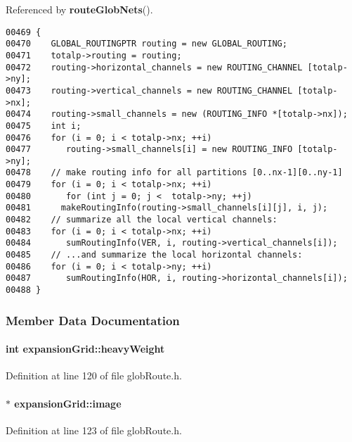 Referenced by {\bf route\-Glob\-Nets}().\small\begin{verbatim}00469 {
00470    GLOBAL_ROUTINGPTR routing = new GLOBAL_ROUTING;
00471    totalp->routing = routing;
00472    routing->horizontal_channels = new ROUTING_CHANNEL [totalp->ny];
00473    routing->vertical_channels = new ROUTING_CHANNEL [totalp->nx];
00474    routing->small_channels = new (ROUTING_INFO *[totalp->nx]);
00475    int i;
00476    for (i = 0; i < totalp->nx; ++i)
00477       routing->small_channels[i] = new ROUTING_INFO [totalp->ny];
00478    // make routing info for all partitions [0..nx-1][0..ny-1]
00479    for (i = 0; i < totalp->nx; ++i)
00480       for (int j = 0; j <  totalp->ny; ++j)
00481      makeRoutingInfo(routing->small_channels[i][j], i, j);
00482    // summarize all the local vertical channels:
00483    for (i = 0; i < totalp->nx; ++i)
00484       sumRoutingInfo(VER, i, routing->vertical_channels[i]);
00485    // ...and summarize the local horizontal channels:
00486    for (i = 0; i < totalp->ny; ++i)
00487       sumRoutingInfo(HOR, i, routing->horizontal_channels[i]);
00488 }
\end{verbatim}\normalsize 


\subsubsection{Member Data Documentation}
\label{expansionGrid_o4}
\paragraph{\setlength{\rightskip}{0pt plus 5cm}int expansion\-Grid::heavy\-Weight\hspace{0.3cm}{\tt  [private]}}\hfill



Definition at line 120 of file glob\-Route.h.\label{expansionGrid_o7}
\paragraph{ $\ast$ expansion\-Grid::image\hspace{0.3cm}{\tt  [private]}}\hfill



Definition at line 123 of file glob\-Route.h.\label{expansionGrid_o5}
